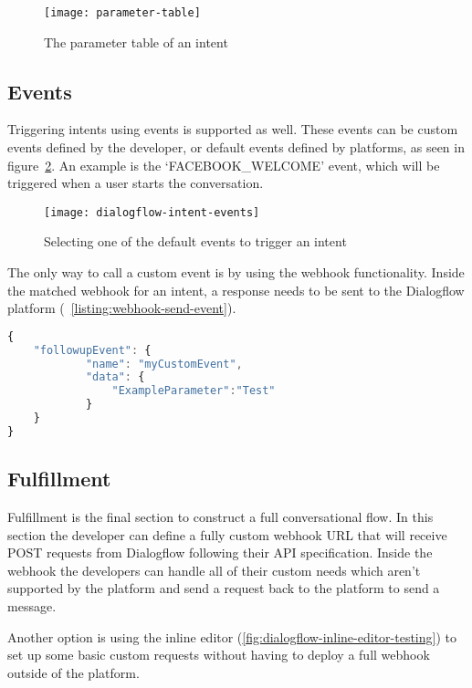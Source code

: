 \begin{figure}[ht]
	\centering
	\texttt{[image: parameter-table]}
	\caption{The parameter table of an intent}
	\label{fig:parameter-table}
\end{figure}

\subsection{Events}

Triggering intents using events is supported as well. These events can be custom events defined by the developer, or default events defined by platforms, as seen in figure~\ref{fig:dialogflow-intent-events}. An example is the `FACEBOOK\_WELCOME' event, which will be triggered when a user starts the conversation.

\begin{figure}[ht]
	\centering
	\texttt{[image: dialogflow-intent-events]}
	\caption{Selecting one of the default events to trigger an intent}
	\label{fig:dialogflow-intent-events}
\end{figure}

\newpage

The only way to call a custom event is by using the webhook functionality. Inside the matched webhook for an intent, a response needs to be sent to the Dialogflow platform (~\ref{listing:webhook-send-event}).

\begin{lstlisting}[language=JavaScript,caption={The response that needs to be sent to the Dialogflow API to trigger a custom event},label=listing:webhook-send-event]
{
	"followupEvent": {
			"name": "myCustomEvent",
			"data": {
				"ExampleParameter":"Test"
			}
	}
}
\end{lstlisting}

\subsection{Fulfillment}

Fulfillment is the final section to construct a full conversational flow. In this section the developer can define a fully custom webhook URL that will receive POST requests from Dialogflow following their API specification. Inside the webhook the developers can handle all of their custom needs which aren't supported by the platform and send a request back to the platform to send a message.

Another option is using the inline editor (\ref{fig:dialogflow-inline-editor-testing}) to set up some basic custom requests without having to deploy a full webhook outside of the platform.